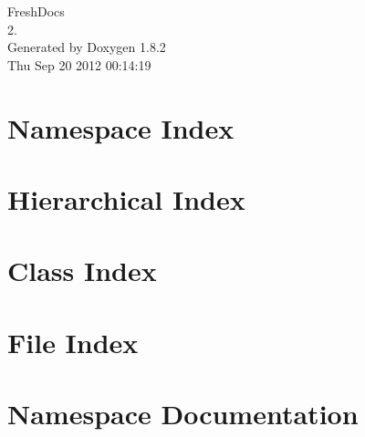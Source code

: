 \documentclass{book}
\begin{document}
\hypersetup{pageanchor=false,citecolor=blue}
\begin{titlepage}
\vspace*{7cm}
\begin{center}
{\Large Fresh\-Docs \\[1ex]\large 2. }\\
\vspace*{1cm}
{\large Generated by Doxygen 1.8.2}\\
\vspace*{0.5cm}
{\small Thu Sep 20 2012 00:14:19}\\
\end{center}
\end{titlepage}
\clearemptydoublepage
{}
\tableofcontents
\clearemptydoublepage
{}
\hypersetup{pageanchor=true,citecolor=blue}
\chapter{Namespace Index}

\chapter{Hierarchical Index}

\chapter{Class Index}

\chapter{File Index}

\chapter{Namespace Documentation}
















\end{document}
